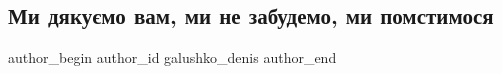  
 
 
 
 

\subsection{Ми дякуємо вам, ми не забудемо, ми помстимося}
\label{sec:08_12_2022.fb.galushko_denis.1.mi_dyaku_mo_vam__mi_}

\ifcmt
 author_begin
   author_id galushko_denis
 author_end
\fi
